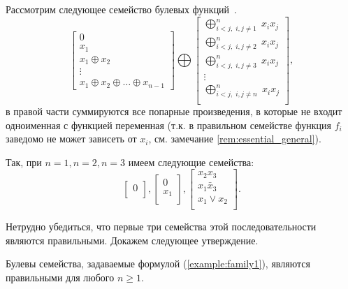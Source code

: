     Рассмотрим следующее семейство булевых функций~\cite{dm21}.
    \begin{equation}
    \label{example:family1}
        \begin{bmatrix}
            0 \\
            x_1 \\
            x_1 \oplus x_2 \\
            \vdots \\
            x_1 \oplus x_2 \oplus \ldots \oplus x_{n-1}
            \end{bmatrix}
            \bigoplus
            \begin{bmatrix}
            \bigoplus_{i < j, \; i, j \ne 1}^n \; x_i x_j \\
            \bigoplus_{i < j, \; i, j \ne 2}^n \; x_i x_j \\
            \bigoplus_{i < j, \; i, j \ne 3}^n \; x_i x_j \\
            \vdots \\
            \bigoplus_{i < j, \; i, j \ne n}^n \; x_i x_j \\
        \end{bmatrix},
    \end{equation}
    в правой части суммируются все попарные произведения, в которые не входит одноименная с функцией переменная (т.к. в правильном семействе функция $f_i$ заведомо не может зависеть от $x_i$, см. замечание \ref{rem:essential_general}).

    Так, при $n=1, n = 2, n=3$ имеем следующие семейства:
    \[
        \begin{bmatrix}
            0 \\
        \end{bmatrix},
        \begin{bmatrix}
            0 \\
            x_1 \\
        \end{bmatrix},
        \begin{bmatrix}
            x_2 x_3 \\
            x_1 \bar{x}_3 \\
            x_1 \vee x_2 \\
        \end{bmatrix}.
    \]

    Нетрудно убедиться, что первые три семейства этой последовательности являются правильными. 
    Докажем следующее утверждение.

    \begin{theorem}[{\cite[Теорема~8]{dm21}}]
    \label{thm:quadfamily}
        Булевы семейства, задаваемые формулой (\ref{example:family1}), являются правильными для любого $n \ge 1$.
    \end{theorem}

